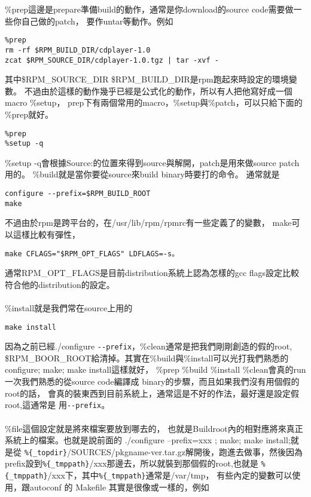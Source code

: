 \%prep這邊是prepare準備build的動作，通常是你download的source code需要做一
些你自己做的patch， 要作untar等動作。例如
\begin{verbatim}
%prep
rm -rf $RPM_BUILD_DIR/cdplayer-1.0
zcat $RPM_SOURCE_DIR/cdplayer-1.0.tgz | tar -xvf -
\end{verbatim}
其中\$RPM\_SOURCE\_DIR \$RPM\_BUILD\_DIR是rpm跑起來時設定的環境變數。
不過由於這樣的動作幾乎已經是公式化的動作，所以有人把他寫好成一個
macro \%setup， prep下有兩個常用的macro，\%setup與\%patch，可以只給下面的
\%prep就好。
\begin{verbatim}
%prep
%setup -q
\end{verbatim}
\%setup -q會根據Source:的位置來得到source與解開，patch是用來做source patch
用的。 \%build就是當你要從source來build binary時要打的命令。
通常就是
\begin{verbatim}
configure --prefix=$RPM_BUILD_ROOT
make
\end{verbatim}
不過由於rpm是跨平台的，在/usr/lib/rpm/rpmrc有一些定義了的變數，
make可以這樣比較有彈性，
\begin{verbatim}
make CFLAGS="$RPM_OPT_FLAGS" LDFLAGS=-s。
\end{verbatim}
通常RPM\_OPT\_FLAGS是目前distribution系統上認為怎樣的gcc flags設定比較
符合他的distribution的設定。
\\\\
\%install就是我們常在source上用的
\begin{verbatim}	
make install
\end{verbatim}	
因為之前已經./configure \verb=--prefix=，\%clean通常是把我們剛剛創造的假的root,
\$RPM\_BOOR\_ROOT給清掉。其實在\%build與\%install可以光打我們熟悉的
configure; make; make install這樣就好，
\%prep \%build \%install \%clean會真的run一次我們熟悉的從source code編譯成
binary的步驟，而且如果我們沒有用個假的root的話，
會真的裝東西到目前系統上，通常這是不好的作法，最好還是設定假root,這通常是
用\verb=--prefix=。
\\\\
\%file這個設定就是將來檔案要放到哪去的，
也就是Buildroot內的相對應將來真正系統上的檔案。也就是說前面的
./configure --prefix=xxx ; make; make install;就是從
\verb=%{_topdir}=/SOURCES/pkgname-ver.tar.gz解開後，跑進去做事，然後因為
prefix設到\verb=%{_tmppath}=/xxx那邊去，所以就裝到那個假的root,也就是
\verb=%{_tmppath}=/xxx下，其中\verb=%{_tmppath}=通常是/var/tmp，
有些內定的變數可以使用，跟autoconf 的 Makefile 其實是很像或一樣的，例如
